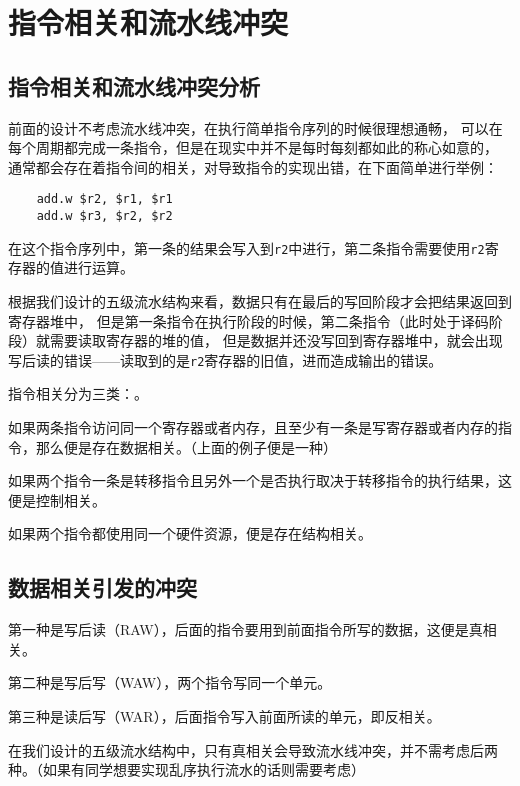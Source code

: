 \section{指令相关和流水线冲突}


\subsection{指令相关和流水线冲突分析}

前面的设计不考虑流水线冲突，在执行简单指令序列的时候很理想通畅，
可以在每个周期都完成一条指令，但是在现实中并不是每时每刻都如此的称心如意的，
通常都会存在着指令间的相关，对导致指令的实现出错，在下面简单进行举例：

\begin{verbatim}
    add.w $r2, $r1, $r1
    add.w $r3, $r2, $r2
\end{verbatim}

在这个指令序列中，第一条的结果会写入到\texttt{r2}中进行，第二条指令需要使用\texttt{r2}寄存器的值进行运算。

根据我们设计的五级流水结构来看，数据只有在最后的写回阶段才会把结果返回到寄存器堆中，
但是第一条指令在执行阶段的时候，第二条指令（此时处于译码阶段）就需要读取寄存器的堆的值，
但是数据并还没写回到寄存器堆中，就会出现写后读的错误——读取到的是\texttt{r2}寄存器的旧值，进而造成输出的错误。

指令相关分为三类：。

如果两条指令访问同一个寄存器或者内存，且至少有一条是写寄存器或者内存的指令，那么便是存在数据相关。（上面的例子便是一种）

如果两个指令一条是转移指令且另外一个是否执行取决于转移指令的执行结果，这便是控制相关。

如果两个指令都使用同一个硬件资源，便是存在结构相关。

\subsection{数据相关引发的冲突}

第一种是写后读（RAW），后面的指令要用到前面指令所写的数据，这便是真相关。

第二种是写后写（WAW），两个指令写同一个单元。

第三种是读后写（WAR），后面指令写入前面所读的单元，即反相关。

在我们设计的五级流水结构中，只有真相关会导致流水线冲突，并不需考虑后两种。（如果有同学想要实现乱序执行流水的话则需要考虑）

